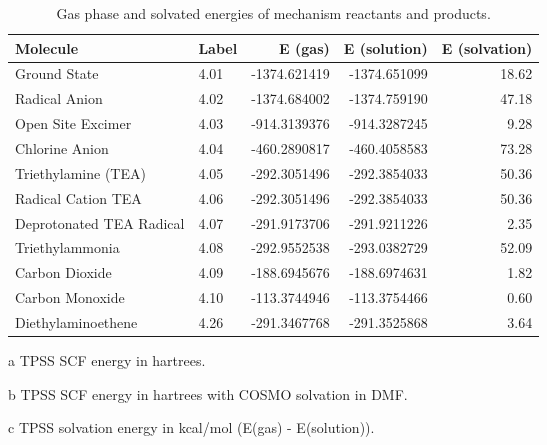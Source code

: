 \begin{table}[!htb]
\centering
 \begin{threeparttable}
  \caption[Gas phase and solvated energies for mechanism reactants and products]{Gas phase and solvated energies of mechanism reactants and products.}
    \begin{tabular}{llrrr}
    \toprule
    Molecule & Label & E (gas)\tnote{a} & E (solution)\tnote{b} & E (solvation)\tnote{c} \\
    \midrule
    Ground State & 4.01 & -1374.621419 & -1374.651099 & 18.62 \\
    Radical Anion & 4.02 & -1374.684002 & -1374.759190 & 47.18 \\
    Open Site Excimer & 4.03 & -914.3139376 & -914.3287245 & 9.28 \\
    Chlorine Anion & 4.04  & -460.2890817 & -460.4058583 & 73.28 \\
    Triethylamine (TEA) & 4.05  & -292.3051496 & -292.3854033 & 50.36 \\
    Radical Cation TEA & 4.06  & -292.3051496 & -292.3854033 & 50.36 \\
    Deprotonated TEA Radical & 4.07  & -291.9173706 & -291.9211226 & 2.35 \\
    Triethylammonia & 4.08  & -292.9552538 & -293.0382729 & 52.09 \\
    Carbon Dioxide & 4.09  & -188.6945676 & -188.6974631 & 1.82 \\
    Carbon Monoxide & 4.10  & -113.3744946 & -113.3754466 & 0.60 \\
    Diethylaminoethene & 4.26  & -291.3467768 & -291.3525868 & 3.64 \\
    \bottomrule
    \end{tabular}%
    \begin{tablenotes}
    \item [a] TPSS SCF energy in hartrees.
    \item [b] TPSS SCF energy in hartrees with COSMO solvation in DMF.
    \item [c] TPSS solvation energy in kcal/mol (E(gas) - E(solution)).
    \end{tablenotes}
  \label{tab.supenergy}%
 \end{threeparttable}
\end{table}%


